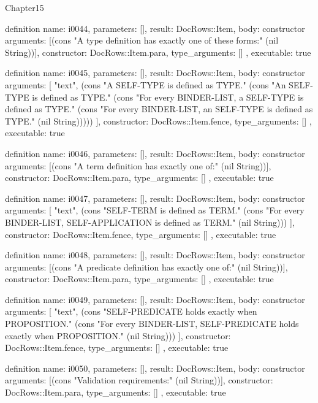 \begin{lexlean}{Chapter15}
\begin{semanticmodule}
definition{
  name: i0044,
  parameters: [],
  result: DocRows::Item,
  body: constructor{
    arguments: [(cons "A type definition has exactly one of these forms:" (nil String))],
    constructor: DocRows::Item.para,
    type_arguments: []
  },
  executable: true
}

definition{
  name: i0045,
  parameters: [],
  result: DocRows::Item,
  body: constructor{
    arguments: [
      "text",
      (cons "A SELF-TYPE is defined as TYPE." (cons "An SELF-TYPE is defined as TYPE." (cons "For every BINDER-LIST, a SELF-TYPE is defined as TYPE." (cons "For every BINDER-LIST, an SELF-TYPE is defined as TYPE." (nil String)))))
    ],
    constructor: DocRows::Item.fence,
    type_arguments: []
  },
  executable: true
}

definition{
  name: i0046,
  parameters: [],
  result: DocRows::Item,
  body: constructor{
    arguments: [(cons "A term definition has exactly one of:" (nil String))],
    constructor: DocRows::Item.para,
    type_arguments: []
  },
  executable: true
}

definition{
  name: i0047,
  parameters: [],
  result: DocRows::Item,
  body: constructor{
    arguments: [
      "text",
      (cons "SELF-TERM is defined as TERM." (cons "For every BINDER-LIST, SELF-APPLICATION is defined as TERM." (nil String)))
    ],
    constructor: DocRows::Item.fence,
    type_arguments: []
  },
  executable: true
}

definition{
  name: i0048,
  parameters: [],
  result: DocRows::Item,
  body: constructor{
    arguments: [(cons "A predicate definition has exactly one of:" (nil String))],
    constructor: DocRows::Item.para,
    type_arguments: []
  },
  executable: true
}

definition{
  name: i0049,
  parameters: [],
  result: DocRows::Item,
  body: constructor{
    arguments: [
      "text",
      (cons "SELF-PREDICATE holds exactly when PROPOSITION." (cons "For every BINDER-LIST, SELF-PREDICATE holds exactly when PROPOSITION." (nil String)))
    ],
    constructor: DocRows::Item.fence,
    type_arguments: []
  },
  executable: true
}

definition{
  name: i0050,
  parameters: [],
  result: DocRows::Item,
  body: constructor{
    arguments: [(cons "Validation requirements:" (nil String))],
    constructor: DocRows::Item.para,
    type_arguments: []
  },
  executable: true
}


\end{semanticmodule}
\end{lexlean}
